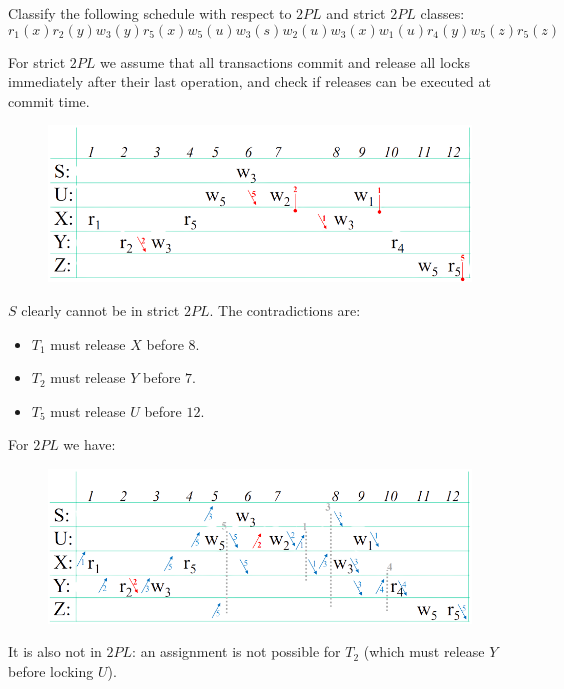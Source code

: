 \documentclass[12pt, a4paper]{report}
\newtheorem[style=M,bodystyle=\normalfont]{theorem}{Theorem}
\newtheorem[style=M,bodystyle=\normalfont]{corollary}{Corollary}
\newtheorem[style=M,bodystyle=\normalfont]{lemma}{Lemma}
\newtheorem[style=M,bodystyle=\normalfont]{definition}{Definition}
\begin{document}
    \begin{Exercise}[label=7]
        Classify the following schedule with respect to $2PL$ and strict $2PL$ classes: 
        \[r_1(x) r_2(y) w_3(y) r_5(x) w_5(u) w_3(s) w_2(u) w_3(x) w_1(u) r_4(y) w_5(z) r_5(z)\]
    \end{Exercise}
    \begin{Answer}[ref=7]
        For strict $2PL$ we assume that all transactions commit and release all locks immediately after their last operation, and check if releases can be executed at commit time.
        \begin{figure}[H]
            \centering
            \includegraphics[width=1\linewidth]{images/2PL1.png}
        \end{figure}
        $S$ clearly cannot be in strict $2PL$. The contradictions are:
        \begin{itemize}
            \item $T_1$ must release $X$ before $8$. 
            \item $T_2$ must release $Y$ before $7$.
            \item $T_5$ must release $U$ before $12$.
        \end{itemize}
        For $2PL$ we have: 
        \begin{figure}[H]
            \centering
            \includegraphics[width=1\linewidth]{images/2PL2.png}
        \end{figure}
        It is also not in $2PL$: an assignment is not possible for $T_2$ (which must release $Y$ before locking $U$).
    \end{Answer}
\end{document}
